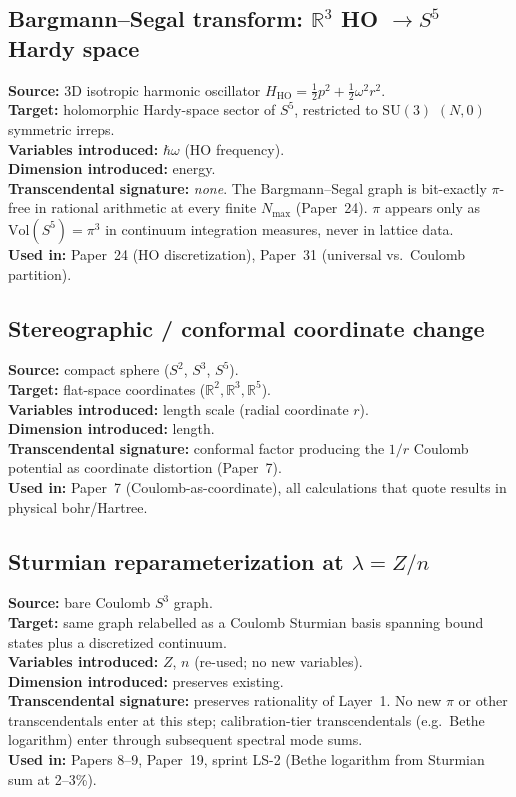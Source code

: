 \documentclass[11pt]{article}
\begin{document}
\subsection{Bargmann--Segal transform: $\mathbb{R}^3$ HO $\to S^5$ Hardy space}
\label{sec:proj_bargmann}
\textbf{Source:} 3D isotropic harmonic oscillator
$H_{\text{HO}} = \tfrac{1}{2}p^2 + \tfrac{1}{2}\omega^2 r^2$.\\
\textbf{Target:} holomorphic Hardy-space sector of $S^5$, restricted
to $\mathrm{SU}(3)$ $(N,0)$ symmetric irreps.\\
\textbf{Variables introduced:} $\hbar\omega$ (HO frequency).\\
\textbf{Dimension introduced:} energy.\\
\textbf{Transcendental signature:} \emph{none}.  The Bargmann--Segal
graph is bit-exactly $\pi$-free in rational arithmetic at every
finite $N_\text{max}$ (Paper~24).  $\pi$ appears only as
$\mathrm{Vol}(S^5) = \pi^3$ in continuum integration measures, never
in lattice data.\\
\textbf{Used in:} Paper~24 (HO discretization), Paper~31 (universal
vs.\ Coulomb partition).

\subsection{Stereographic / conformal coordinate change}
\label{sec:proj_stereo}
\textbf{Source:} compact sphere ($S^2$, $S^3$, $S^5$).\\
\textbf{Target:} flat-space coordinates ($\mathbb{R}^2, \mathbb{R}^3,
\mathbb{R}^5$).\\
\textbf{Variables introduced:} length scale (radial coordinate $r$).\\
\textbf{Dimension introduced:} length.\\
\textbf{Transcendental signature:} conformal factor producing the
$1/r$ Coulomb potential as coordinate distortion (Paper~7).\\
\textbf{Used in:} Paper~7 (Coulomb-as-coordinate), all calculations
that quote results in physical bohr/Hartree.

\subsection{Sturmian reparameterization at $\lambda = Z/n$}
\label{sec:proj_sturmian}
\textbf{Source:} bare Coulomb $S^3$ graph.\\
\textbf{Target:} same graph relabelled as a Coulomb Sturmian basis
spanning bound states plus a discretized continuum.\\
\textbf{Variables introduced:} $Z$, $n$ (re-used; no new variables).\\
\textbf{Dimension introduced:} preserves existing.\\
\textbf{Transcendental signature:} preserves rationality of
Layer~1.  No new $\pi$ or other transcendentals enter at this step;
calibration-tier transcendentals (e.g.\ Bethe logarithm) enter
through subsequent spectral mode sums.\\
\textbf{Used in:} Papers 8--9, Paper~19, sprint LS-2 (Bethe logarithm
from Sturmian sum at 2--3\%).
\end{document}
